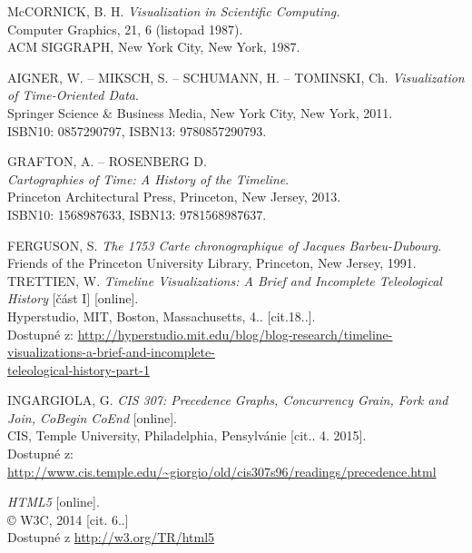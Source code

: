 \begin{flushleft}
	\begin{thebibliography}{99}
			
			McCORNICK, B. H. {\it Visualization in Scientific Computing.}\\
			 Computer Graphics, 21, 6 (listopad 1987).\\
			ACM SIGGRAPH, New York City, New York, 1987.
			
			AIGNER, W. -- MIKSCH, S. -- SCHUMANN, H. -- TOMINSKI, Ch. {\it Visualization of Time-Oriented Data}.\\
			Springer Science \& Business Media, New York City, New York, 2011.\\
			ISBN10: 0857290797, ISBN13: 9780857290793.
			
			GRAFTON, A. -- ROSENBERG D.\\
			{\it Cartographies of Time: A History of the Timeline}.\\
			Princeton Architectural Press, Princeton, New Jersey, 2013.\\
			ISBN10: 1568987633, ISBN13: 9781568987637.
			
			FERGUSON, S. {\it The 1753 Carte chronographique of Jacques Barbeu-Dubourg}.\\
			Friends of the Princeton University Library, Princeton, New Jersey, 1991.\\
		
			TRETTIEN, W. {\it Timeline Visualizations: A Brief and Incomplete Teleological History} [část I] [online].\\
			Hyperstudio, MIT, Boston, Massachusetts, 4.. [cit.18..].\\
			Dostupné z: \url{http://hyperstudio.mit.edu/blog/blog-research/timeline-visualizations-a-brief-and-incomplete-}\\
			\url{teleological-history-part-1}
		
			INGARGIOLA, G. {\it CIS 307: Precedence Graphs, Concurrency Grain, Fork and Join, CoBegin CoEnd} [online].\\
			CIS, Temple University, Philadelphia, Pensylvánie [cit.. 4. 2015].\\
			Dostupné z: \url{http://www.cis.temple.edu/~giorgio/old/cis307s96/readings/precedence.html}
			
			{\it HTML5} [online].\\
			© W3C, 2014 [cit. 6..]\\
			Dostupné z \url{http://w3.org/TR/html5}
			

\end{thebibliography}
\end{flushleft}
